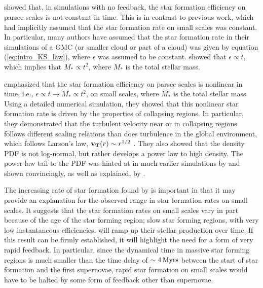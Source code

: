 \documentclass[../dissertation.tex]{subfiles}
\begin{document}
\subsection{\citet{2015ApJ...800...49L}} \label{Lee15_model}

\citet{2015ApJ...800...49L} showed that, in simulations with no feedback, the star formation efficiency on
parsec scales is not constant in time.
This is in contrast to previous work, which had implicitly assumed that the star formation rate on small scales was constant.
In particular, many authors have assumed that the star formation rate in their simulations of a GMC (or smaller cloud or part of a cloud) was given by equation (\ref{eq:intro_KS_law}), where $\epsilon$ was assumed to be constant.
\citet{2015ApJ...800...49L} showed that $\epsilon \propto t$, which implies that $M_* \propto t^2$, where $M_*$ is the total stellar mass.

\citet{2015ApJ...800...49L} emphasized that the star formation efficiency on 
parsec scales is nonlinear 
in time, i.e., $\epsilon \propto t \rightarrow M_* \propto t^2$, on small scales, where $M_*$ is the total stellar mass. 
Using a detailed numerical simulation, they showed that this nonlinear star formation 
rate is driven by the properties of collapsing regions.
In particular, they demonstrated that the turbulent velocity near or in collapsing regions follows 
different scaling relations than does turbulence in the global environment, which follows
Larson's law, $\mathbf{v_T} (r)\sim r^{1/2}$ \citep{1981MNRAS.194..809L}. 
They also showed that the density PDF 
is not log-normal, but rather develops a power law to high density.
The power law tail to the  PDF  was hinted at in much earlier simulations by \citet{2000ApJ...535..869K} and shown convincingly, 
as well as explained, by \citet{2011ApJ...727L..20K}. 

The increasing rate of star formation found by \citet{2015ApJ...800...49L} is important 
in that it may provide an explanation for the observed range in star formation rates on 
small scales.  It suggests that the star formation rates on small scales 
vary in part because of the age of the star forming region; slow star forming 
regions, with very low instantaneous efficiencies, will ramp up their stellar production over time. If this result
can be firmly established, it will highlight the need for a form of very rapid 
feedback. In particular, since the dynamical time in massive star forming regions 
is much smaller than the time delay of $\sim 4{\,\rm Myrs}$ between the start of star 
formation and the first supernovae, rapid star formation on small scales would 
have to be halted by some form of feedback other than supernovae. 
\end{document}
